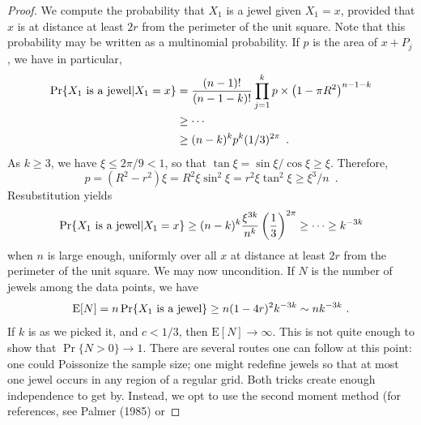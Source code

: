 \documentclass[10pt]{llncs}
\newcommand{\PROB}{\Pr}
\newcommand{\EXP}{\mathrm{E}}
\begin{document}
\begin{proof}
We compute the probability that $X_1$ is a jewel
given $X_1 = x$, provided that $x$ is at distance at
least $2r$ from the perimeter of the unit square.
Note that this probability may be written as
a multinomial probability. If $p$ is the area
of $x+P_j$, we have in particular,
\[
\begin{aligned}
\PROB \{ X_1 ~\hbox{\rm is a jewel} | X_1 = x \}
&=  {(n-1)! \over (n-1-k)!} \prod_{j=1}^k p \times \left( 1 - \pi R^2 \right)^{n-1-k} \\
&\ge \cdots \\
&\ge  (n-k)^k p^k (1/3)^{2\pi} \enspace . 
\end{aligned}
\]
As $k \ge 3$, we have $\xi \le 2\pi/9 < 1$, so that
$\tan \xi = \sin \xi / \cos \xi \ge \xi$.
Therefore, 
\[
p = (R^2 - r^2) \xi = R^2 \xi \sin^2 \xi
  = r^2 \xi \tan^2 \xi \ge \xi^3/n \enspace .
\]
Resubstitution yields
\[
\PROB \{ X_1 ~\hbox{\rm is a jewel} | X_1 = x \}
 \ge (n-k)^k {\xi^{3k} \over n^k} \left( {1 \over 3} \right)^{2\pi} 
\ge \cdots
 \ge k^{-3k}
\]
when $n$ is large enough, uniformly over all $x$
at distance at least $2r$ from the perimeter of the unit square.
We may now uncondition. If $N$ is the 
number of jewels among the data points, we have
\[
\EXP[N]
 = n \PROB \{ X_1 ~\hbox{\rm is a jewel} \}
 \ge n (1-4r)^2 k^{-3k}
 \sim n k^{-3k}~.
\]
If $k$ is as we picked it, and $c < 1/3$,
then $\EXP[N] \to \infty$.
This is not quite enough to show that 
$\PROB \{ N > 0 \} \to 1$.
There are several routes one can follow at this
point: one could Poissonize the sample
size; one might redefine jewels so that
at most one jewel occurs in any region of
a regular grid. Both tricks create
enough independence to get by.
Instead, we opt to use the second moment
method (for references, see Palmer (1985) or

\end{proof}
\end{document}
